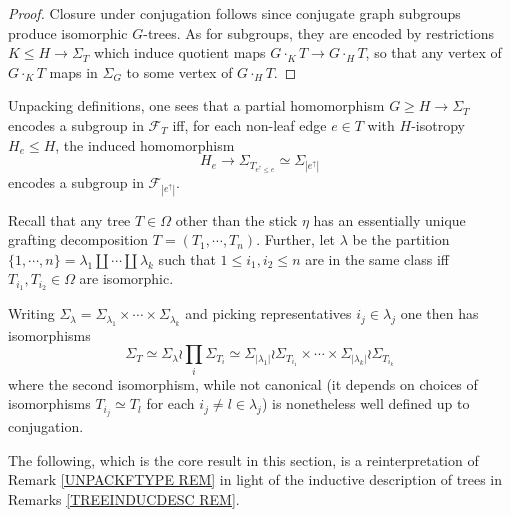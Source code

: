 \documentclass[a4paper,10pt]{article}%
\begin{document}
\begin{proof}
  Closure under conjugation follows since conjugate graph subgroups produce isomorphic $G$-trees.
  As for subgroups, they are encoded by restrictions $K \leq H \to \Sigma_T$ which induce
  quotient maps 
  $G \cdot_K T \to G \cdot_H T$, so that any vertex of 
  $G \cdot_K T$ maps in $\Sigma_G$ to some vertex of $G \cdot_H T$.
\end{proof}



\begin{remark}\label{UNPACKFTYPE REM}
  Unpacking definitions, one sees that a partial homomorphism 
  $G \geq H \to \Sigma_T$
  encodes a subgroup in $\mathcal{F}_T$
  iff, for each non-leaf edge $e \in T$ with $H$-isotropy $H_e \leq H$, the induced homomorphism
  \begin{equation}\label{PARTIALHOMEDGE EQ}
    H_e \to \Sigma_{T_{e^{\uparrow}\leq e}} \simeq 
    \Sigma_{|e^{\uparrow}|}
  \end{equation}
  encodes a subgroup in $\mathcal{F}_{|e^{\uparrow}|}$.
\end{remark}




\begin{remark}\label{TREEINDUCDESC REM}
  Recall that any tree $T \in \Omega$ other than the stick $\eta$ has an essentially unique grafting decomposition
  $T=(T_1,\cdots,T_n)$. Further, let
  $\lambda$ be the partition 
  $\{1,\cdots,n\} = \lambda_1 \amalg\cdots \amalg \lambda_k$
  such that $1 \leq i_1, i_2 \leq n$ are in the same class iff
  $T_{i_1}, T_{i_2} \in \Omega$ are isomorphic.
  
  Writing 
  $\Sigma_{\lambda} = \Sigma_{\lambda_1} \times \cdots \times
  \Sigma_{\lambda_k}$
  and picking representatives $i_j \in \lambda_j$ 
  one then has isomorphisms
  \begin{equation}\label{TREEISOT EQ}
    \Sigma_T \simeq \Sigma_{\lambda} \wr \prod_{i} \Sigma_{T_i}
    \simeq
    \Sigma_{|\lambda_1|} \wr \Sigma_{T_{i_1}}
    \times \cdots \times	
    \Sigma_{|\lambda_k|} \wr \Sigma_{T_{i_k}}
  \end{equation}
  where the second isomorphism, while not canonical 
  (it depends on choices of isomorphisms $T_{i_j} \simeq T_l$ for each $i_j \neq l \in \lambda_j$) is nonetheless well defined up to conjugation.
\end{remark}


The following, which is the core result in this section, is a reinterpretation of 
Remark \ref{UNPACKFTYPE REM}
in light of the inductive description of trees in
Remarks \ref{TREEINDUCDESC REM}.
\end{document}
